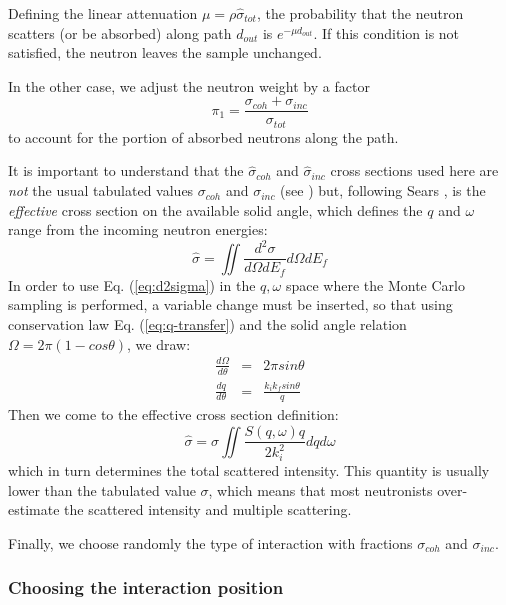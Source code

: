 Defining the linear attenuation $\mu = \rho\hat{\sigma}_{tot}$, the probability that the neutron scatters (or be absorbed) along path $d_{out}$ is $e^{-\mu d_{out}}$. If this condition is not satisfied, the neutron leaves the sample unchanged.

In the other case, we adjust the neutron weight by a factor
\begin{equation}
\pi_1 = \frac{\sigma_{coh} + \sigma_{inc}}{\sigma_{tot}}
\end{equation}
to account for the portion of absorbed neutrons along the path.

It is important to understand that the $\hat{\sigma}_{coh}$ and $\hat{\sigma}_{inc}$ cross sections used here are \emph{not} the usual tabulated values $\sigma_{coh}$ and $\sigma_{inc}$ (see \cite{ILLblue}) but, following Sears \cite{Sears75}, is the \emph{effective} cross section on the available solid angle, which defines the $q$ and $\omega$ range from the incoming neutron energies:
\begin{equation}
\hat{\sigma} = \iint \frac{d^2 \sigma}{d\Omega dE_f} d\Omega dE_f
\end{equation}
In order to use Eq. (\ref{eq:d2sigma}) in the $q,\omega$ space where the Monte Carlo sampling is performed, a variable change must be inserted, so that using conservation law Eq. (\ref{eq:q-transfer}) and the solid angle relation $\Omega=2\pi(1-cos \theta)$, we draw:
\begin{eqnarray}\label{eq:dqdw}
\frac{d\Omega}{d\theta} &=& 2\pi sin \theta \\
\frac{dq}{d\theta} &=& \frac{k_i k_f sin \theta}{q}
\end{eqnarray}
Then we come to the effective cross section definition:
\begin{equation}
\hat{\sigma} = \sigma \iint \frac{S(q,\omega) q}{2 k_i^2} dq d\omega
\end{equation}
which in turn determines the total scattered intensity. This quantity is usually lower than the tabulated value $\sigma$, which means that most neutronists over-estimate the scattered intensity and multiple scattering.

Finally, we choose randomly the type of interaction with fractions $\sigma_{coh}$ and $\sigma_{inc}$.

\subsubsection{Choosing the interaction position}

